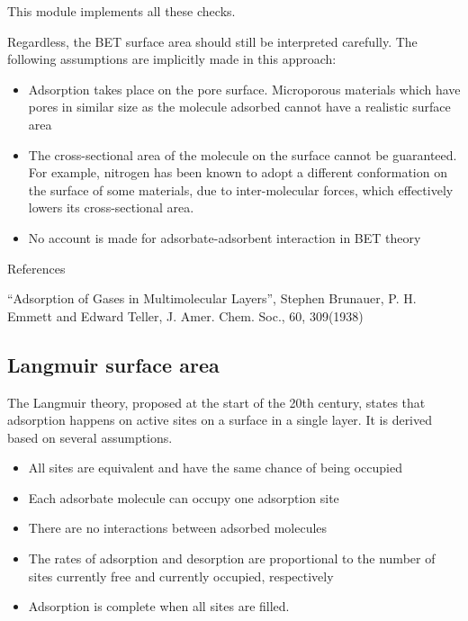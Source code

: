 This module implements all these checks.

Regardless, the BET surface area should still be interpreted carefully.
The following assumptions are implicitly made in this approach:

\begin{itemize}

    \item Adsorption takes place on the pore surface. Microporous materials
            which have pores in similar size as the molecule adsorbed
            cannot have a realistic surface area
    \item The cross-sectional area of the molecule on the surface
            cannot be guaranteed. For example, nitrogen has been known to adopt
            a different conformation on the surface of some materials,
            due to inter-molecular forces, which effectively
            lowers its cross-sectional area.
    \item No account is made for adsorbate-adsorbent interaction in BET theory

\end{itemize}

References

“Adsorption of Gases in Multimolecular Layers”, Stephen Brunauer,
P. H. Emmett and Edward Teller, J. Amer. Chem. Soc., 60, 309(1938)


\subsection{Langmuir surface area}

The Langmuir theory, proposed at the start of the 20th century,
states that adsorption happens on active sites on a surface
in a single layer. It is derived based on several assumptions.

\begin{itemize}
    \item All sites are equivalent and have the same chance of being occupied
    \item Each adsorbate molecule can occupy one adsorption site
    \item There are no interactions between adsorbed molecules
    \item The rates of adsorption and desorption are proportional to the number
            of sites currently free and currently occupied, respectively
    \item Adsorption is complete when all sites are filled.
\end{itemize}

